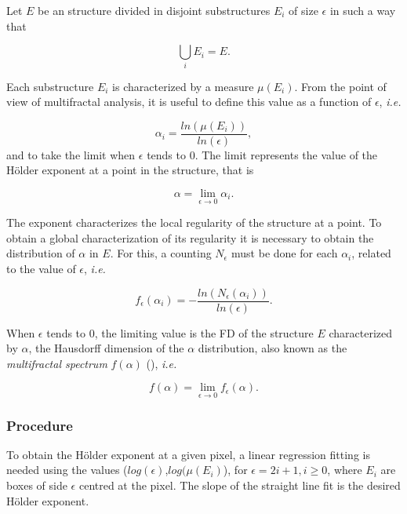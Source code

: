 \documentclass[oneside,a4paper,english,links]{article}
\begin{document}
Let $E$ be an structure divided in disjoint substructures $E_{i}$ of size $\epsilon$ in such a way that 

\begin{equation}
\displaystyle\bigcup_{i}E_{i} = E.
\end{equation}

Each substructure $E_{i}$ is characterized by a measure $\mu(E_{i})$. From the point of view of multifractal analysis, it is useful to define this value as a function of $\epsilon$, {\em i.e.}


\begin{equation}
\alpha_{i} = \frac{ln(\mu(E_{i}))}{ln(\epsilon)},
\label{eqn:eqn4}
\end{equation}
\noindent
and to take the limit when $\epsilon$ tends to $0$. The limit represents the value of the H\"older exponent at a point in the structure, that is

\begin{equation}
\alpha = \lim_{\epsilon\to0}{\alpha_{i}}.
\label{eqn:eqn5}
\end{equation}

The exponent characterizes the local regularity of the structure at a point. To obtain a global characterization of its regularity it is necessary to obtain the distribution of $\alpha$ in $E$. For this, a counting $N_{\epsilon}$ must be done for each $\alpha_{i}$, related to the value of $\epsilon$, {\em i.e.}

\begin{equation}
f_{\epsilon}(\alpha_{i}) = - \frac{ln(N_{\epsilon}(\alpha_{i}))}{ln(\epsilon)}.
\label{eqn:eqn6}
\end{equation}

When $\epsilon$ tends to $0$, the limiting value is the FD of the structure $E$ characterized by $\alpha$, the Hausdorff dimension of the $\alpha$ distribution, also known as the {\em multifractal spectrum} $f(\alpha)$ (\cite{Silvetti2010}), {\em i.e.}

\begin{equation}
f(\alpha) = \lim_{\epsilon\to0}{f_{\epsilon}(\alpha)}.
\label{eqn:eqn7}
\end{equation}

\subsubsection{Procedure}
To obtain the H\"older exponent at a given pixel, a linear regression fitting is needed using the values ($log(\epsilon)$,$log(\mu(E_{i})$), for $\epsilon = 2i + 1, i \ge 0$, where $E_{i}$ are boxes of side $\epsilon$ centred at the pixel. The slope of the straight line fit is the desired H\"older exponent.
\end{document}
